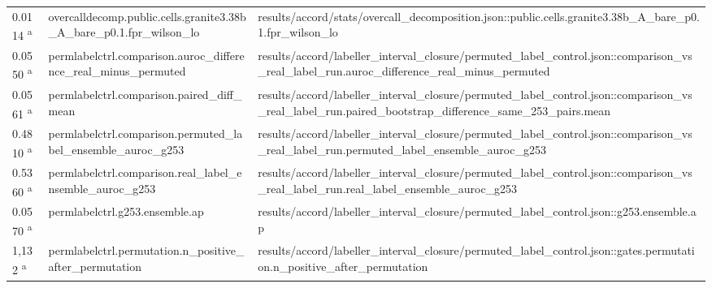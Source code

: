 \begin{longtable}{@{}p{0.7in}p{1.9in}p{2.6in}@{}}
0.0114 \textsuperscript{a} & overcalldecomp.\allowbreak{}public.\allowbreak{}cells.\allowbreak{}granite3.\allowbreak{}38b\_A\_bare\_p0.\allowbreak{}1.\allowbreak{}fpr\_wilson\_lo & results/\allowbreak{}accord/\allowbreak{}stats/\allowbreak{}overcall\_decomposition.\allowbreak{}json::public.\allowbreak{}cells.\allowbreak{}granite3.\allowbreak{}38b\_A\_bare\_p0.\allowbreak{}1.\allowbreak{}fpr\_wilson\_lo\\
0.0550 \textsuperscript{a} & permlabelctrl.\allowbreak{}comparison.\allowbreak{}auroc\_difference\_real\_minus\_permuted & results/\allowbreak{}accord/\allowbreak{}labeller\_interval\_closure/\allowbreak{}permuted\_label\_control.\allowbreak{}json::comparison\_vs\_real\_label\_run.\allowbreak{}auroc\_difference\_real\_minus\_permuted\\
0.0561 \textsuperscript{a} & permlabelctrl.\allowbreak{}comparison.\allowbreak{}paired\_diff\_mean & results/\allowbreak{}accord/\allowbreak{}labeller\_interval\_closure/\allowbreak{}permuted\_label\_control.\allowbreak{}json::comparison\_vs\_real\_label\_run.\allowbreak{}paired\_bootstrap\_difference\_same\_253\_pairs.\allowbreak{}mean\\
0.4810 \textsuperscript{a} & permlabelctrl.\allowbreak{}comparison.\allowbreak{}permuted\_label\_ensemble\_auroc\_g253 & results/\allowbreak{}accord/\allowbreak{}labeller\_interval\_closure/\allowbreak{}permuted\_label\_control.\allowbreak{}json::comparison\_vs\_real\_label\_run.\allowbreak{}permuted\_label\_ensemble\_auroc\_g253\\
0.5360 \textsuperscript{a} & permlabelctrl.\allowbreak{}comparison.\allowbreak{}real\_label\_ensemble\_auroc\_g253 & results/\allowbreak{}accord/\allowbreak{}labeller\_interval\_closure/\allowbreak{}permuted\_label\_control.\allowbreak{}json::comparison\_vs\_real\_label\_run.\allowbreak{}real\_label\_ensemble\_auroc\_g253\\
0.0570 \textsuperscript{a} & permlabelctrl.\allowbreak{}g253.\allowbreak{}ensemble.\allowbreak{}ap & results/\allowbreak{}accord/\allowbreak{}labeller\_interval\_closure/\allowbreak{}permuted\_label\_control.\allowbreak{}json::g253.\allowbreak{}ensemble.\allowbreak{}ap\\
1,132 \textsuperscript{a} & permlabelctrl.\allowbreak{}permutation.\allowbreak{}n\_positive\_after\_permutation & results/\allowbreak{}accord/\allowbreak{}labeller\_interval\_closure/\allowbreak{}permuted\_label\_control.\allowbreak{}json::gates.\allowbreak{}permutation.\allowbreak{}n\_positive\_after\_permutation\\

\end{longtable}
